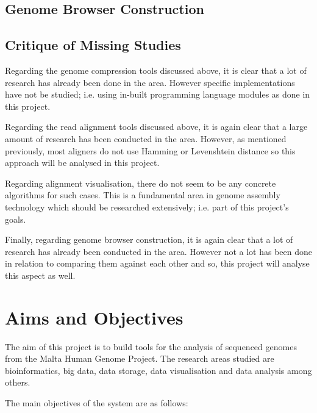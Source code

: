 \documentclass{csfyp}
\begin{document}
\subsection{Genome Browser Construction}


\subsection{Critique of Missing Studies}
Regarding the genome compression tools discussed above, it is clear that a lot of research has already been done in the area.  However specific implementations have not be studied; i.e. using in-built programming language modules as done in this project.
  
Regarding the read alignment tools discussed above, it is again clear that a large amount of research has been conducted in the area.  However, as mentioned previously, most aligners do not use Hamming or Levenshtein distance so this approach will be analysed in this project. 
 
Regarding alignment visualisation, there do not seem to be any concrete algorithms for such cases.  This is a fundamental area in genome assembly technology which should be researched extensively; i.e. part of this project's goals.

Finally, regarding genome browser construction, it is again clear that a lot of research has already been conducted in the area.  However not a lot has been done in relation to comparing them against each other and so, this project will analyse this aspect as well.      

\section{Aims and Objectives}

The aim of this project is to build tools for the analysis of sequenced genomes from the Malta Human Genome Project.  The research areas studied are bioinformatics, big data, data storage, data visualisation and data analysis among others.

The main objectives of the system are as follows:
\end{document}

